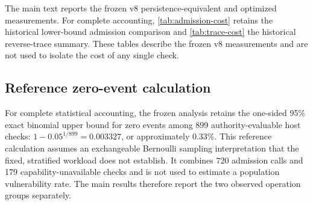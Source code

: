 The main text reports the frozen v8 persistence-equivalent and optimized measurements. For complete accounting, \cref{tab:admission-cost} retains the historical lower-bound admission comparison and \cref{tab:trace-cost} the historical reverse-trace summary. These tables describe the frozen v8 measurements and are not used to isolate the cost of any single check.





\subsection{Reference zero-event calculation}
\label{app:zero-event}
For complete statistical accounting, the frozen analysis retains the one-sided 95\% exact binomial upper bound for zero events among 899 authority-evaluable host checks: $1-0.05^{1/899}=0.003327$, or approximately 0.33\%. This reference calculation assumes an exchangeable Bernoulli sampling interpretation that the fixed, stratified workload does not establish. It combines 720 admission calls and 179 capability-unavailable checks and is not used to estimate a population vulnerability rate. The main results therefore report the two observed operation groups separately.
